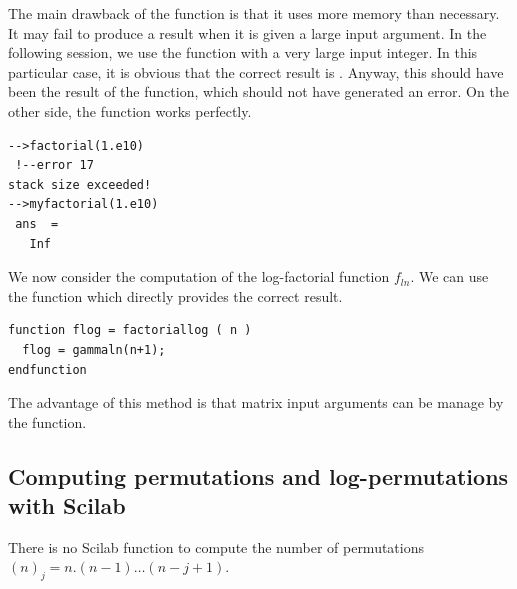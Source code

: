The main drawback of the  function 
is that it uses more memory than necessary. It may fail to produce 
a result when it is given a large input argument.
In the following session, we use the  function
with a very large input integer. 
In this particular case, it is obvious that the correct result 
is . Anyway, this should have been the result 
of the function, which should not have generated an error.
On the other side, the  function works 
perfectly.
\lstset{language=scilabscript}
\begin{lstlisting}
-->factorial(1.e10)
 !--error 17 
stack size exceeded!
-->myfactorial(1.e10)
 ans  =
   Inf  
\end{lstlisting}

We now consider the computation of the log-factorial function $f_{ln}$.
We can use the  function which directly provides the 
correct result.
\lstset{language=scilabscript}
\begin{lstlisting}
function flog = factoriallog ( n )
  flog = gammaln(n+1);
endfunction
\end{lstlisting}
The advantage of this method is that matrix input arguments 
can be manage by the  function.

\subsection{Computing permutations and log-permutations with Scilab}
\label{sec-computeperm}

There is no Scilab function to compute the number of 
permutations $(n)_j = n.(n-1)\ldots (n-j+1)$.

